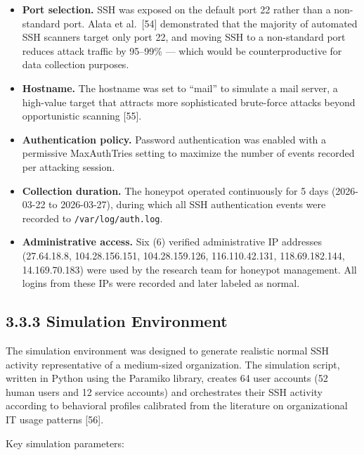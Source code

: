 \documentclass[
  a4paper]{report}
\providecommand{\tightlist}{%
  \setlength{\itemsep}{0pt}\setlength{\parskip}{0pt}}
\begin{document}
\begin{itemize}
\tightlist
\item
  \textbf{Port selection.} SSH was exposed on the default port 22 rather
  than a non-standard port. Alata et al.~{[}54{]} demonstrated that the
  majority of automated SSH scanners target only port 22, and moving SSH
  to a non-standard port reduces attack traffic by 95--99\% --- which
  would be counterproductive for data collection purposes.
\item
  \textbf{Hostname.} The hostname was set to ``mail'' to simulate a mail
  server, a high-value target that attracts more sophisticated
  brute-force attacks beyond opportunistic scanning {[}55{]}.
\item
  \textbf{Authentication policy.} Password authentication was enabled
  with a permissive MaxAuthTries setting to maximize the number of
  events recorded per attacking session.
\item
  \textbf{Collection duration.} The honeypot operated continuously for 5
  days (2026-03-22 to 2026-03-27), during which all SSH authentication
  events were recorded to \texttt{/var/log/auth.log}.
\item
  \textbf{Administrative access.} Six (6) verified administrative IP
  addresses (27.64.18.8, 104.28.156.151, 104.28.159.126, 116.110.42.131,
  118.69.182.144, 14.169.70.183) were used by the research team for
  honeypot management. All logins from these IPs were recorded and later
  labeled as normal.
\end{itemize}

\subsection{3.3.3 Simulation Environment}\label{simulation-environment}

The simulation environment was designed to generate realistic normal SSH
activity representative of a medium-sized organization. The simulation
script, written in Python using the Paramiko library, creates 64 user
accounts (52 human users and 12 service accounts) and orchestrates their
SSH activity according to behavioral profiles calibrated from the
literature on organizational IT usage patterns {[}56{]}.

Key simulation parameters:
\end{document}
